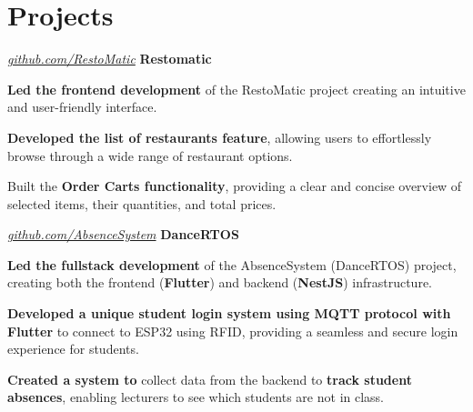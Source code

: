 \documentclass[../main.tex]{subfiles}
\begin{document}
\section{Projects}

\begin{twocolentry}{
    \small
    \textit{\href{https://github.com/SistemBasisData2023/RestoMatic}{github.com/RestoMatic}}
}
    \textbf{Restomatic}
\end{twocolentry}

\vspace{0.10 cm}
\begin{onecolentry}
\begin{highlights}
    \item \textbf{Led the frontend development} of the RestoMatic project creating an intuitive and user-friendly interface.
    \item \textbf{Developed the list of restaurants feature}, allowing users to effortlessly browse through a wide range of restaurant options.
    \item Built the \textbf{Order Carts functionality}, providing a clear and concise overview of selected items, their quantities, and total prices.
\end{highlights}
\end{onecolentry}

\vspace{0.2 cm}

\begin{twocolentry}{
    \small
    \textit{\href{https://github.com/cattyman919/AbsenceSystem/tree/main}{github.com/AbsenceSystem}}
}
    \textbf{DanceRTOS}
\end{twocolentry}

\vspace{0.10 cm}
\begin{onecolentry}
\begin{highlights}
    \item \textbf{Led the fullstack development} of the AbsenceSystem (DanceRTOS) project, creating both the frontend (\textbf{Flutter}) and backend (\textbf{NestJS}) infrastructure.
    \item \textbf{Developed a unique student login system using MQTT protocol with Flutter} to connect to ESP32 using RFID, providing a seamless and secure login experience for students.
    \item \textbf{Created a system to} collect data from the backend to \textbf{track student absences}, enabling lecturers to see which students are not in class.
\end{highlights}
\end{onecolentry}
\end{document}
